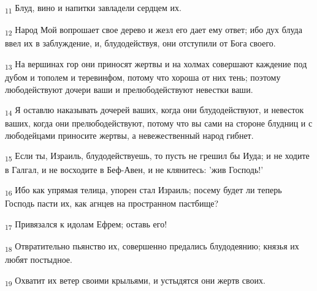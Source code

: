 \begin{tcolorbox}
\textsubscript{11} Блуд, вино и напитки завладели сердцем их.
\end{tcolorbox}
\begin{tcolorbox}
\textsubscript{12} Народ Мой вопрошает свое дерево и жезл его дает ему ответ; ибо дух блуда ввел их в заблуждение, и, блудодействуя, они отступили от Бога своего.
\end{tcolorbox}
\begin{tcolorbox}
\textsubscript{13} На вершинах гор они приносят жертвы и на холмах совершают каждение под дубом и тополем и теревинфом, потому что хороша от них тень; поэтому любодействуют дочери ваши и прелюбодействуют невестки ваши.
\end{tcolorbox}
\begin{tcolorbox}
\textsubscript{14} Я оставлю наказывать дочерей ваших, когда они блудодействуют, и невесток ваших, когда они прелюбодействуют, потому что вы сами на стороне блудниц и с любодейцами приносите жертвы, а невежественный народ гибнет.
\end{tcolorbox}
\begin{tcolorbox}
\textsubscript{15} Если ты, Израиль, блудодействуешь, то пусть не грешил бы Иуда; и не ходите в Галгал, и не восходите в Беф-Авен, и не клянитесь: 'жив Господь!'
\end{tcolorbox}
\begin{tcolorbox}
\textsubscript{16} Ибо как упрямая телица, упорен стал Израиль; посему будет ли теперь Господь пасти их, как агнцев на пространном пастбище?
\end{tcolorbox}
\begin{tcolorbox}
\textsubscript{17} Привязался к идолам Ефрем; оставь его!
\end{tcolorbox}
\begin{tcolorbox}
\textsubscript{18} Отвратительно пьянство их, совершенно предались блудодеянию; князья их любят постыдное.
\end{tcolorbox}
\begin{tcolorbox}
\textsubscript{19} Охватит их ветер своими крыльями, и устыдятся они жертв своих.
\end{tcolorbox}
